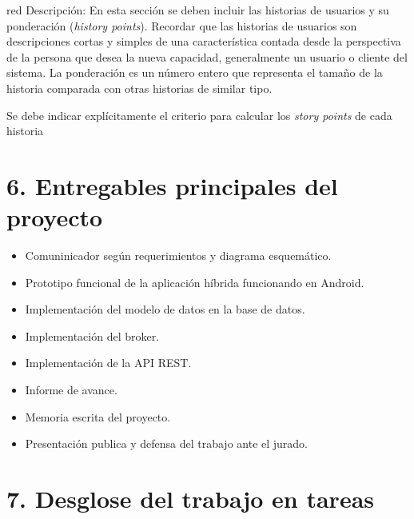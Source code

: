 \documentclass[
11pt, %
codirector, %
]{charter}
\begin{document}
\begin{consigna}{red}
Descripción: En esta sección se deben incluir las historias de usuarios y su ponderación (\textit{history points}). Recordar que las historias de usuarios son descripciones cortas y simples de una característica contada desde la perspectiva de la persona que desea la nueva capacidad, generalmente un usuario o cliente del sistema. La ponderación es un número entero que representa el tamaño de la historia comparada con otras historias de similar tipo.

Se debe indicar explícitamente el criterio para calcular los \textit{story points} de cada historia
\end{consigna}

\section{6. Entregables principales del proyecto}
\label{sec:entregables}


\begin{itemize}
	\item Comuninicador según requerimientos y diagrama esquemático.
	\item Prototipo funcional de la aplicación híbrida funcionando en Android.
	\item Implementación del modelo de datos en la base de datos.
	\item Implementación del broker.
	\item Implementación de la API REST.
	\item Informe de avance.
	\item Memoria escrita del proyecto.
	\item Presentación publica y defensa del trabajo ante el jurado.
\end{itemize}


\section{7. Desglose del trabajo en tareas}
\label{sec:wbs}

\end{document}

